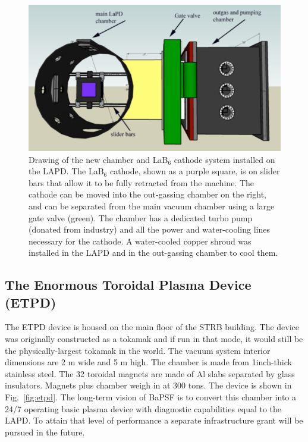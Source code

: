 \documentclass[11pt]{article}
\begin{document}
\begin{figure}[htbp] %
   \centering
   \includegraphics[width=6in]{lab6cartoon.jpg} 
   \caption{Drawing of the new chamber and LaB$_{6}$ cathode system installed on the LAPD.  The LaB$_{6}$ cathode, shown as a purple square, is on slider bars that allow it to be fully retracted from the machine.  The cathode can be moved into the out-gassing chamber on the right, and can be separated from the main vacuum chamber using a large gate valve (green).  The chamber has a dedicated turbo pump (donated from industry) and all the power and water-cooling lines necessary for the cathode.  A water-cooled copper shroud was installed in the LAPD and in the out-gassing chamber to cool them.}
   \label{fig:lab6cartoon}
\end{figure}
		
		


\subsection{The Enormous Toroidal Plasma Device (ETPD)}
The ETPD device is housed on the main floor of the STRB building.  The device was originally constructed as a tokamak and if run in that mode, it would still be the physically-largest tokamak in the world.  The vacuum system interior dimensions are 2 m wide and 5 m high.  The chamber is made from 1inch-thick stainless steel.  The 32 toroidal magnets are made of Al slabs separated by glass insulators.  Magnets plus chamber weigh in at 300 tons. The device is shown in Fig.\ \ref{fig:etpd}.   The long-term vision of BaPSF is to convert this chamber into a 24/7 operating basic plasma device with diagnostic capabilities equal to the LAPD. To attain that level of performance a separate infrastructure grant will be pursued in the future. 
\end{document}
